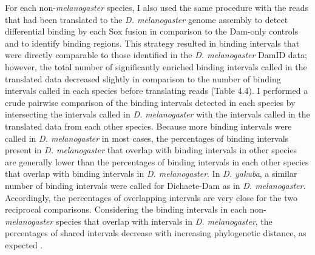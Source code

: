 For each non-\emph{melanogaster} species, I also used the same procedure with the reads that had been translated to the \emph{D. melanogaster} genome assembly to detect differential binding by each Sox fusion in comparison to the Dam-only controls and to identify binding regions. This strategy resulted in binding intervals that were directly comparable to those identified in the \emph{D. melanogaster} DamID data; however, the total number of significantly enriched binding intervals called in the translated data decreased slightly in comparison to the number of binding intervals called in each species before translating reads (Table 4.4). I performed a crude pairwise comparison of the binding intervals detected in each species by intersecting the intervals called in \emph{D. melanogaster} with the intervals called in the translated data from each other species. Because more binding intervals were called in \emph{D. melanogaster} in most cases, the percentages of binding intervals present in \emph{D. melanogaster} that overlap with binding intervals in other species are generally lower than the percentages of binding intervals in each other species that overlap with binding intervals in \emph{D. melanogaster}. In \emph{D. yakuba}, a similar number of binding intervals were called for Dichaete-Dam as in \emph{D. melanogaster}. Accordingly, the percentages of overlapping intervals are very close for the two reciprocal comparisons. Considering the binding intervals in each non-\emph{melanogaster} species that overlap with intervals in \emph{D. melanogaster}, the percentages of shared intervals decrease with increasing phylogenetic distance, as expected \citep{he_high_2011,paris_extensive_2013}.\\

